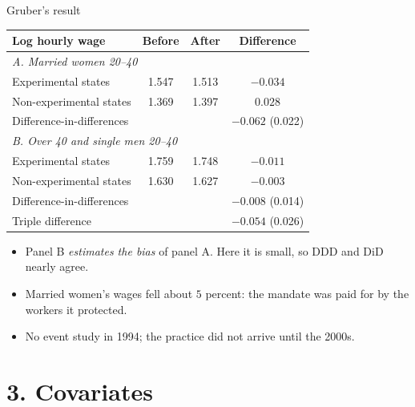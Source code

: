 \documentclass[
  11pt,
  ignorenonframetext,
  aspectratio=169,
]{beamer}
\providecommand{\tightlist}{%
  \setlength{\itemsep}{0pt}\setlength{\parskip}{0pt}}
\begin{document}
\begin{frame}{Gruber's result}
\protect{}\label{grubers-result}
\begin{center}\scriptsize
\begin{tabular}{lccc}
\toprule
Log hourly wage & Before & After & Difference \\
\midrule
\multicolumn{4}{l}{\emph{A. Married women 20--40}} \\
Experimental states & 1.547 & 1.513 & $-0.034$ \\
Non-experimental states & 1.369 & 1.397 & $0.028$ \\
Difference-in-differences & & & $\mathbf{-0.062}$ (0.022) \\
\midrule
\multicolumn{4}{l}{\emph{B. Over 40 and single men 20--40}} \\
Experimental states & 1.759 & 1.748 & $-0.011$ \\
Non-experimental states & 1.630 & 1.627 & $-0.003$ \\
Difference-in-differences & & & $\mathbf{-0.008}$ (0.014) \\
\midrule
Triple difference & & & $\mathbf{-0.054}$ (0.026) \\
\bottomrule
\end{tabular}
\end{center}

\begin{itemize}
\tightlist
\item
  Panel B \emph{estimates the bias} of panel A. Here it is small, so DDD
  and DiD nearly agree.
\item
  Married women's wages fell about \(5\) percent: the mandate was paid
  for by the workers it protected.
\item
  No event study in 1994; the practice did not arrive until the 2000s.
\end{itemize}
\end{frame}

\section{3. Covariates}\label{covariates}
\end{document}
